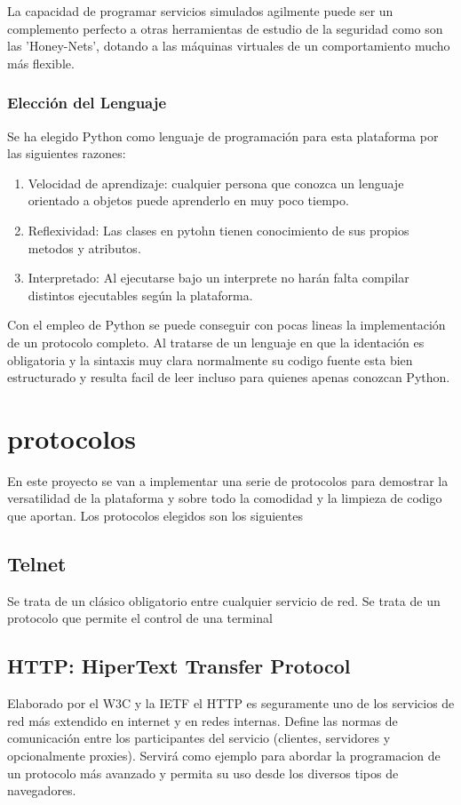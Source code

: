 \documentclass[a4paper,spanish,12pt]{book}
\begin{document}
La capacidad de programar servicios simulados agilmente puede ser un complemento perfecto a otras herramientas de estudio de la seguridad como son las 'Honey-Nets', dotando a las m\'aquinas virtuales de un comportamiento mucho m\'as flexible.

\subsection{Elecci\'on del Lenguaje} 
Se ha elegido Python como lenguaje de programaci\'on para esta plataforma por las siguientes razones:
\begin{enumerate}
\item Velocidad de aprendizaje: cualquier persona que conozca un lenguaje orientado a objetos puede aprenderlo en muy poco tiempo.
\item Reflexividad: Las clases en pytohn tienen conocimiento de sus propios metodos y atributos.
\item Interpretado: Al ejecutarse bajo un interprete no har\'an falta compilar distintos ejecutables seg\'un la plataforma.
\end{enumerate}

Con el empleo de Python se puede conseguir con pocas lineas la implementaci\'on de un protocolo completo. Al tratarse de un lenguaje en que la identaci\'on es obligatoria y la sintaxis muy clara normalmente su codigo fuente esta bien estructurado y resulta facil de leer incluso para quienes apenas conozcan Python.

\chapter{protocolos}
En este proyecto se van a implementar una serie de protocolos para demostrar la versatilidad de la plataforma y sobre todo la comodidad y la limpieza de codigo que aportan. Los protocolos elegidos son los siguientes
\section{Telnet}
Se trata de un cl\'asico obligatorio entre cualquier servicio de red. Se trata de un protocolo que permite el control de una terminal 
\section{HTTP: HiperText Transfer Protocol}
Elaborado por el W3C y la IETF el HTTP es seguramente uno de los servicios de red más extendido en internet y en redes internas. Define las normas de comunicación entre los participantes del servicio (clientes, servidores y opcionalmente proxies). Servirá como ejemplo para abordar la programacion de un protocolo m\'as avanzado y permita su uso desde los diversos tipos de navegadores.
\end{document}
